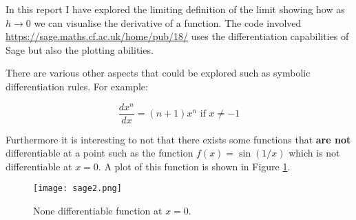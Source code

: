 \documentclass[a4paper]{article}
\begin{document}
In this report I have explored the limiting definition of the limit showing how as $h\to 0$ we can visualise the derivative of a function. The code involved \url{https://sage.maths.cf.ac.uk/home/pub/18/} uses the differentiation capabilities of Sage but also the plotting abilities.

There are various other aspects that could be explored such as symbolic differentiation rules. For example:

$$\frac{dx^n}{dx}=(n+1)x^{n}\text{ if }x\ne-1$$

Furthermore it is interesting to not that there exists some functions that \textbf{are not} differentiable at a point such as the function $f(x)=\sin(1/x)$ which is not differentiable at $x=0$. A plot of this function is shown in Figure \ref{notdiff}.

\begin{figure}[!htbp]
\begin{center}
\texttt{[image: sage2.png]}
\end{center}
\caption{None differentiable function at $x=0$.}\label{notdiff}
\end{figure}




\end{document}
